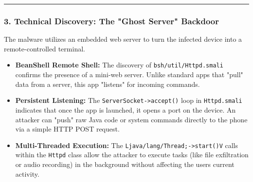 \documentclass[
]{article}
\begin{document}
\begin{center}\rule{0.5\linewidth}{0.5pt}\end{center}

\subsubsection{3. Technical Discovery: The "Ghost Server"
Backdoor}\label{3-technical-discovery-the-ghost-server-backdoor}

The malware utilizes an embedded web server to turn the infected device
into a remote-controlled terminal.

\begin{itemize}
\item
  \textbf{BeanShell Remote Shell:} The discovery of
  \texttt{bsh/util/Httpd.smali} confirms the presence of a mini-web
  server. Unlike standard apps that "pull" data from a server, this app
  "listens" for incoming commands.
\item
  \textbf{Persistent Listening:} The
  \texttt{ServerSocket-\textgreater{}accept()} loop in
  \texttt{Httpd.smali} indicates that once the app is launched, it opens
  a port on the device. An attacker can "push" raw Java code or system
  commands directly to the phone via a simple HTTP POST request.
\item
  \textbf{Multi-Threaded Execution:} The
  \texttt{Ljava/lang/Thread;-\textgreater{}start()V} calls within the
  \texttt{Httpd} class allow the attacker to execute tasks (like file
  exfiltration or audio recording) in the background without affecting
  the user\textquotesingle s current activity.
\end{itemize}
\end{document}
